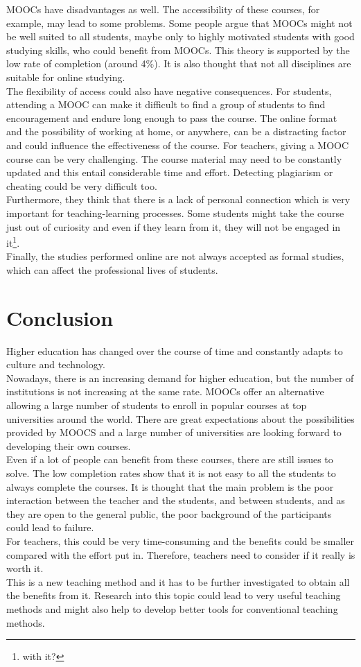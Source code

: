 \documentclass[a4paper,10pt]{report}
\begin{document}
MOOCs have disadvantages as well. The accessibility 
of these courses, for example, may lead to some problems. Some people argue that  
MOOCs might not be well suited to all students, maybe only to highly motivated students with 
good studying skills, who could benefit from MOOCs. This theory is supported by the low rate 
of completion (around 4\%).
It is also thought that not all disciplines are
suitable for online studying.\\
The flexibility of access could also have negative consequences. For students, attending a MOOC 
can make it difficult to find a group of students
to find encouragement and endure long enough to pass the course. The online format
and the possibility of working at home, or anywhere, can be a distracting factor 
and could influence the effectiveness of the course.
For teachers, giving a MOOC course can be very challenging. 
The course material may need to be constantly
updated and this entail considerable time and effort. 
Detecting plagiarism or cheating could be very difficult too.\\
Furthermore, they think that there is a lack of personal
connection which is very important for teaching-learning processes.
Some students might take the course just out of curiosity and even if they learn from it,
they will not be engaged in it\footnote{with it?}.\\
Finally, the studies performed online are not always accepted as formal studies, 
which can affect the professional lives of students. 
\newpage
\section*{Conclusion}
Higher education has changed over the course of time and constantly adapts to culture and 
technology.\\
Nowadays, there is an increasing demand for higher education, but the number of institutions is not 
increasing at the same rate. MOOCs offer an alternative allowing a large number of
students to enroll in popular courses at top universities around the world. There are great expectations
about the possibilities provided by MOOCS and a large number of universities are looking forward to developing their own courses.\\
Even if a lot of people can benefit from these courses, there are still issues to solve. 
The low completion rates show that it is not easy to all the students to always complete the courses.
It is thought that the main problem is the poor interaction between the teacher and the students, 
and between students, and as they are open to the general public, the poor background of the participants 
could lead to failure.\\
For teachers, this could be very time-consuming and the benefits could be smaller compared with
the effort put in. Therefore, teachers need to consider if it really is worth it.\\
This is a new teaching method and it has to be further investigated to
obtain all the benefits from it. Research into this topic could lead to 
very useful teaching methods and might also help to develop better tools for 
 conventional teaching methods. 



\end{document}
